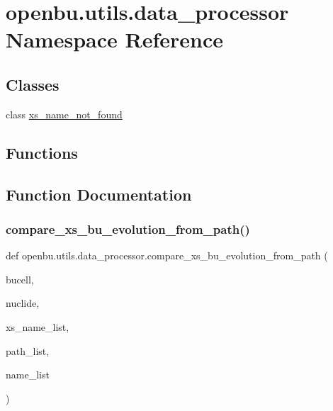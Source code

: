 \hypertarget{namespaceopenbu_1_1utils_1_1data__processor}{}\section{openbu.\+utils.\+data\+\_\+processor Namespace Reference}
\label{namespaceopenbu_1_1utils_1_1data__processor}
\subsection*{Classes}
\begin{DoxyCompactItemize}
\item 
class \mbox{\hyperlink{classopenbu_1_1utils_1_1data__processor_1_1xs__name__not__found}{xs\+\_\+name\+\_\+not\+\_\+found}}
\end{DoxyCompactItemize}
\subsection*{Functions}


\subsection{Function Documentation}
\mbox{\label{namespaceopenbu_1_1utils_1_1data__processor_a06700d792856aad7f11dc7898a50077a}} 
\subsubsection{\texorpdfstring{compare\+\_\+xs\+\_\+bu\+\_\+evolution\+\_\+from\+\_\+path()}{compare\_xs\_bu\_evolution\_from\_path()}}
{\footnotesize\ttfamily def openbu.\+utils.\+data\+\_\+processor.\+compare\+\_\+xs\+\_\+bu\+\_\+evolution\+\_\+from\+\_\+path (\begin{DoxyParamCaption}\item[{}]{bucell,  }\item[{}]{nuclide,  }\item[{}]{xs\+\_\+name\+\_\+list,  }\item[{}]{path\+\_\+list,  }\item[{}]{name\+\_\+list }\end{DoxyParamCaption})}


